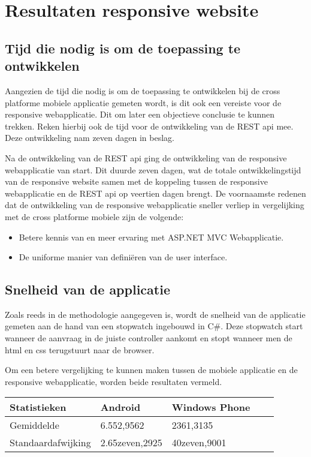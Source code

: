 \chapter{Resultaten responsive website}
\label{ch:resultatenresponsivewebsite}
\section{Tijd die nodig is om de toepassing te ontwikkelen}
Aangezien de tijd die nodig is om de toepassing te ontwikkelen bij de cross platforme mobiele applicatie gemeten wordt,
is dit ook een vereiste voor de responsive webapplicatie. Dit om later een objectieve conclusie te kunnen trekken.
Reken hierbij ook de tijd voor de ontwikkeling van de REST api mee. Deze ontwikkeling nam zeven dagen in beslag.

Na de ontwikkeling van de REST api ging de ontwikkeling van de responsive webapplicatie van start.
Dit duurde zeven dagen, wat de totale ontwikkelingstijd van de responsive website samen met de koppeling tussen de responsive webapplicatie
en de REST api op veertien dagen brengt. De voornaamste redenen dat de ontwikkeling van de responsive webapplicatie sneller verliep in vergelijking met de cross platforme mobiele zijn de volgende:
\begin{itemize}
  \item Betere kennis van en meer ervaring met ASP.NET MVC Webapplicatie.
  \item De uniforme manier van definiëren van de user interface.
\end{itemize}

\section{Snelheid van de applicatie}
Zoals reeds in de methodologie aangegeven is, wordt de snelheid van de applicatie gemeten aan de hand van een stopwatch ingebouwd in C\#.
Deze stopwatch start wanneer de aanvraag in de juiste controller aankomt en stopt wanneer men de html en css terugstuurt naar de browser.

Om een betere vergelijking te kunnen maken tussen de mobiele applicatie en de responsive webapplicatie, worden beide resultaten vermeld.

\begin{center}
\begin{tabular}{| l | l | l | | l | l }
  \hline
  Statistieken & Android & Windows Phone \\ \hline
  Gemiddelde & 6.552,9562 & 2361,3135 \\ \hline
  Standaardafwijking & 2.65zeven,2925 & 40zeven,9001 \\
  \hline
\end{tabular}
\end{center}

